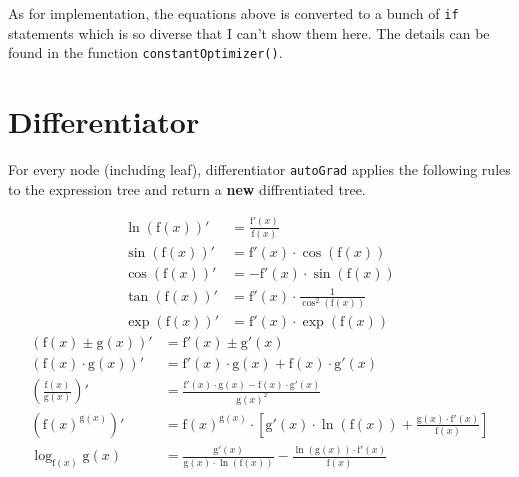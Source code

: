 \documentclass[a4paper,oneside]{book}
\begin{document}
As for implementation, the equations above is converted to a bunch of \verb|if| statements which is so diverse that I can't show them here. The details can be found in the function \verb|constantOptimizer()|.

\section{Differentiator}

For every node (including leaf), differentiator \verb|autoGrad| applies the following rules to the expression tree and return a \textbf{new} diffrentiated tree.

\begin{multicols}{2}
    \begin{align*}
        \ln({\mathrm{f}(x)})'  & = \frac{{\mathrm{f}'(x)}}{{\mathrm{f}(x)}}                 \\
        \sin({\mathrm{f}(x)})' & = {\mathrm{f}'(x)} \cdot \cos({\mathrm{f}(x)})             \\
        \cos({\mathrm{f}(x)})' & = -{\mathrm{f}'(x)} \cdot \sin({\mathrm{f}(x)})            \\
        \tan({\mathrm{f}(x)})' & = {\mathrm{f}'(x)} \cdot \frac{1}{\cos^2({\mathrm{f}(x)})} \\
        \exp({\mathrm{f}(x)})' & = {\mathrm{f}'(x)} \cdot \exp({\mathrm{f}(x)})
    \end{align*}\break
    \begin{align*}
        ({\mathrm{f}(x)} \pm {\mathrm{g}(x)})'     & = {\mathrm{f}'(x)} \pm {\mathrm{g}'(x)}                                                                                                                  \\
        ({\mathrm{f}(x)} \cdot {\mathrm{g}(x)})'   & = {\mathrm{f}'(x)} \cdot {\mathrm{g}(x)} + {\mathrm{f}(x)} \cdot {\mathrm{g}'(x)}                                                                        \\
        (\frac{{\mathrm{f}(x)}}{{\mathrm{g}(x)}})' & = \frac{{\mathrm{f}'(x)} \cdot {\mathrm{g}(x)} - {\mathrm{f}(x)} \cdot {\mathrm{g}'(x)}}{{\mathrm{g}(x)}^2}                                              \\
        ({\mathrm{f}(x)}^{{\mathrm{g}(x)}})'       & = {\mathrm{f}(x)}^{{\mathrm{g}(x)}} \cdot [{\mathrm{g}'(x)} \cdot \ln({\mathrm{f}(x)}) + \frac{{\mathrm{g}(x)} \cdot {\mathrm{f}'(x)}}{{\mathrm{f}(x)}}] \\
        \log_{\mathrm{f}(x)} {\mathrm{g}(x)}       & = \frac{{\mathrm{g}'(x)}}{{\mathrm{g}(x)} \cdot \ln({\mathrm{f}(x)})} - \frac{\ln({\mathrm{g}(x)}) \cdot {\mathrm{f}'(x)}}{{\mathrm{f}(x)} }
    \end{align*}
\end{multicols}
\end{document}
